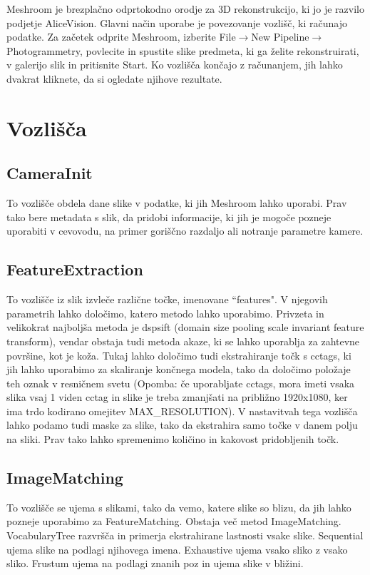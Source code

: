 Meshroom je brezplačno odprtokodno orodje za 3D rekonstrukcijo, ki jo je razvilo podjetje AliceVision. Glavni način uporabe je povezovanje vozlišč, ki računajo podatke. Za začetek odprite Meshroom, izberite File$\rightarrow$New Pipeline$\rightarrow$Photogrammetry, povlecite in spustite slike predmeta, ki ga želite rekonstruirati, v galerijo slik in pritisnite Start. Ko vozlišča končajo z računanjem, jih lahko dvakrat kliknete, da si ogledate njihove rezultate. \cite{Meshroom}

\section{Vozlišča}

\subsection{CameraInit}
    To vozlišče obdela dane slike v podatke, ki jih Meshroom lahko uporabi. Prav tako bere metadata s slik, da pridobi informacije, ki jih je mogoče pozneje uporabiti v cevovodu, na primer goriščno razdaljo ali notranje parametre kamere.


\subsection{FeatureExtraction}
    To vozlišče iz slik izvleče različne točke, imenovane ``features". V njegovih parametrih lahko določimo, katero metodo lahko uporabimo. Privzeta in velikokrat najboljša metoda je dspsift (domain size pooling scale invariant feature transform), vendar obstaja tudi metoda akaze, ki se lahko uporablja za zahtevne površine, kot je koža. Tukaj lahko določimo tudi ekstrahiranje točk s cctags, ki jih lahko uporabimo za skaliranje končnega modela, tako da določimo položaje teh oznak v resničnem svetu (Opomba: če uporabljate cctags, mora imeti vsaka slika vsaj 1 viden cctag in slike je treba zmanjšati na približno 1920x1080, ker ima trdo kodirano omejitev MAX\_RESOLUTION).
    V nastavitvah tega vozlišča lahko podamo tudi maske za slike, tako da ekstrahira samo točke v danem polju na sliki. Prav tako lahko spremenimo količino in kakovost pridobljenih točk.
    
\subsection{ImageMatching}
    To vozlišče se ujema s slikami, tako da vemo, katere slike so blizu, da jih lahko pozneje uporabimo za FeatureMatching. Obstaja več metod ImageMatching. VocabularyTree razvršča in primerja ekstrahirane lastnosti vsake slike. Sequential ujema slike na podlagi njihovega imena. Exhaustive ujema vsako sliko z vsako sliko. Frustum ujema na podlagi znanih poz in ujema slike v bližini.

